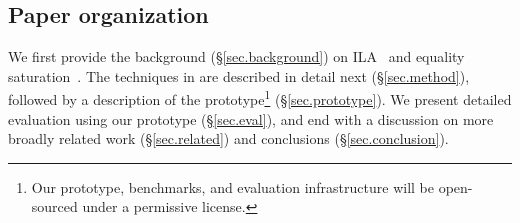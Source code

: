 \subsection{Paper organization}
We first provide the background (\S\ref{sec.background}) on ILA~\cite{huang2018instruction} and 
equality saturation~\cite{joshi2002denali, tate2011equality}.
The techniques in {\TLA} are described in detail next (\S\ref{sec.method}), followed by a description of the
{\TLA} prototype\footnote{Our prototype, benchmarks, and evaluation infrastructure will be open-sourced under a permissive license.} (\S\ref{sec.prototype}). 
We present detailed evaluation using our prototype (\S\ref{sec.eval}), and end with a discussion on more broadly related work (\S\ref{sec.related}) and conclusions (\S\ref{sec.conclusion}).
      
